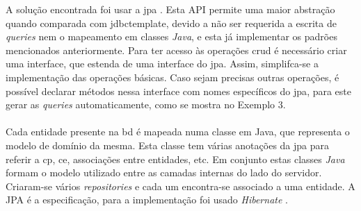 A solução encontrada foi usar a \acrfull{jpa} \cite{javaee6:jpa}. Esta API permite uma maior abstração quando comparada com \acrshort{jdbctemplate}, devido a não ser requerida a escrita de \textit{queries} nem o mapeamento em classes \textit{Java}, e esta já implementar os padrões mencionados anteriormente. Para ter acesso às operações \acrshort{crud} é necessário criar uma interface, que estenda de uma interface do \acrshort{jpa}. Assim, simplifca-se a implementação das operações básicas. Caso sejam precisas outras operações, é possível declarar métodos nessa interface com nomes específicos do \acrshort{jpa}, para este gerar as \textit{queries} automaticamente, como se mostra no Exemplo 3.\\

\hspace{-1.25cm}
\\[0.25cm]


Cada entidade presente na \acrshort{bd} é mapeada numa classe em Java, que representa o modelo de domínio da mesma. Esta classe tem várias anotações da \acrshort{jpa} para referir a \acrlong{cp}, \acrlong{ce}, associações entre entidades, etc. Em conjunto estas classes \textit{Java} formam o modelo utilizado entre as camadas internas do lado do servidor. 
Criaram-se vários \textit{repositories} e cada um encontra-se associado a uma entidade.
A JPA é a especificação, para a implementação foi usado \textit{Hibernate} \cite{Hibernate:online}.